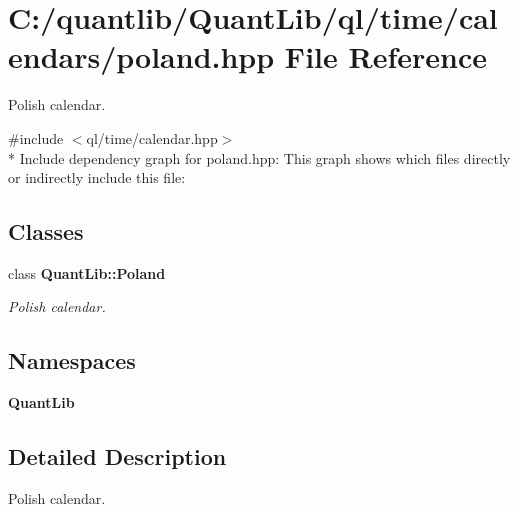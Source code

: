\section{C\+:/quantlib/\+Quant\+Lib/ql/time/calendars/poland.hpp File Reference}
\label{poland_8hpp}


Polish calendar.  


{\ttfamily \#include $<$ql/time/calendar.\+hpp$>$}\\*
Include dependency graph for poland.\+hpp\+:
This graph shows which files directly or indirectly include this file\+:
\subsection*{Classes}
\begin{DoxyCompactItemize}
\item 
class {\bf Quant\+Lib\+::\+Poland}
\begin{DoxyCompactList}\small\item\em Polish calendar. \end{DoxyCompactList}\end{DoxyCompactItemize}
\subsection*{Namespaces}
\begin{DoxyCompactItemize}
\item 
 {\bf Quant\+Lib}
\end{DoxyCompactItemize}


\subsection{Detailed Description}
Polish calendar. 

